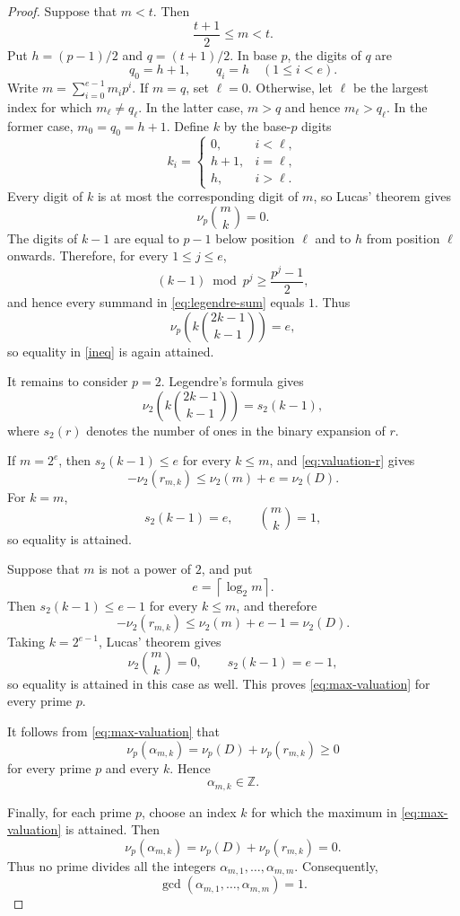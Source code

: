 \documentclass[10pt,a4paper]{amsart}
\newcommand{\vp}{\nu_p}
\begin{document}
\begin{proof}
Suppose that \(m<t\). Then
\[
\frac{t+1}{2}\leq m<t.
\]
Put \(h=(p-1)/2\) and \(q=(t+1)/2\). In base \(p\), the digits of
\(q\) are
\[
q_0=h+1,
\qquad
q_i=h\quad (1\leq i<e).
\]
Write \(m=\sum_{i=0}^{e-1}m_ip^i\). If \(m=q\), set \(\ell=0\).
Otherwise, let \(\ell\) be the largest index for which \(m_\ell\neq q_\ell\).
In the latter case, $m>q$ and hence $m_\ell>q_\ell$. In the former case,
$m_0=q_0=h+1$. Define \(k\) by the base-\(p\)
digits
\[
k_i=
\begin{cases}
0,&i<\ell,\\
h+1,&i=\ell,\\
h,&i>\ell.
\end{cases}
\]
Every digit of \(k\) is at most the corresponding digit of \(m\), so
Lucas' theorem gives
\[
\vp\binom{m}{k}=0.
\]
The digits of \(k-1\) are equal to \(p-1\) below position \(\ell\) and
to \(h\) from position \(\ell\) onwards. Therefore, for every
\(1\leq j\leq e\),
\[
(k-1)\bmod p^j\geq\frac{p^j-1}{2},
\]
and hence every summand in \eqref{eq:legendre-sum} equals \(1\).
Thus
\[
\vp\!\left(k\binom{2k-1}{k-1}\right)=e,
\]
so equality in \eqref{ineq} is again attained.

It remains to consider \(p=2\). Legendre's formula gives
\begin{equation}\label{eq:binary-weight}
\nu_2\!\left(k\binom{2k-1}{k-1}\right)=s_2(k-1),
\end{equation}
where \(s_2(r)\) denotes the number of ones in the binary expansion of
\(r\).

If \(m=2^e\), then \(s_2(k-1)\leq e\) for every \(k\leq m\), and
\eqref{eq:valuation-r} gives
\[
-\nu_2(r_{m,k})\leq\nu_2(m)+e=\nu_2(D).
\]
For \(k=m\),
\[
s_2(k-1)=e,
\qquad
\binom{m}{k}=1,
\]
so equality is attained.

Suppose that \(m\) is not a power of \(2\), and put
\[
e=\left\lceil\log_2m\right\rceil.
\]
Then \(s_2(k-1)\leq e-1\) for every \(k\leq m\), and therefore
\[
-\nu_2(r_{m,k})
\leq
\nu_2(m)+e-1
=
\nu_2(D).
\]
Taking \(k=2^{e-1}\), Lucas' theorem gives
\[
\nu_2\binom{m}{k}=0,
\qquad
s_2(k-1)=e-1,
\]
so equality is attained in this case as well. This proves
\eqref{eq:max-valuation} for every prime \(p\).

It follows from \eqref{eq:max-valuation} that
\[
\vp(\alpha_{m,k})
=
\vp(D)+\vp(r_{m,k})
\geq0
\]
for every prime \(p\) and every \(k\). Hence
\[
\alpha_{m,k}\in\mathbb Z.
\]

Finally, for each prime \(p\), choose an index \(k\) for which the maximum
in \eqref{eq:max-valuation} is attained. Then
\[
\vp(\alpha_{m,k})
=
\vp(D)+\vp(r_{m,k})
=
0.
\]
Thus no prime divides all the integers \(\alpha_{m,1},\ldots,\alpha_{m,m}\).
Consequently,
\[
\gcd(\alpha_{m,1},\ldots,\alpha_{m,m})=1.
\]
\end{proof}
\end{document}
